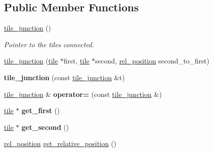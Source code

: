 \subsection*{Public Member Functions}
\begin{DoxyCompactItemize}
\item 
\hypertarget{classtile__junction_a4bf49829337b48a2274208556d370d21}{\hyperlink{classtile__junction_a4bf49829337b48a2274208556d370d21}{tile\-\_\-junction} ()}\label{classtile__junction_a4bf49829337b48a2274208556d370d21}

\begin{DoxyCompactList}\small\item\em Pointer to the tiles connected. \end{DoxyCompactList}\item 
\hyperlink{classtile__junction_a7dc0f70f66725c0eaa1dd5f04e2d6a2a}{tile\-\_\-junction} (\hyperlink{classtile}{tile} $\ast$first, \hyperlink{classtile}{tile} $\ast$second, \hyperlink{classtile__junction_a5456dfccc6f959d29361cde7104b4c25}{rel\-\_\-position} second\-\_\-to\-\_\-first)
\item 
\hypertarget{classtile__junction_a489352ce572927f3c61dd30f969e30bc}{{\bfseries tile\-\_\-junction} (const \hyperlink{classtile__junction}{tile\-\_\-junction} \&t)}\label{classtile__junction_a489352ce572927f3c61dd30f969e30bc}

\item 
\hypertarget{classtile__junction_abb4fe40d3298a13cbd8dece57e5698e7}{\hyperlink{classtile__junction}{tile\-\_\-junction} \& {\bfseries operator=} (const \hyperlink{classtile__junction}{tile\-\_\-junction} \&)}\label{classtile__junction_abb4fe40d3298a13cbd8dece57e5698e7}

\item 
\hypertarget{classtile__junction_aaa07c6f05c7920cf7094df8519998f58}{\hyperlink{classtile}{tile} $\ast$ {\bfseries get\-\_\-first} ()}\label{classtile__junction_aaa07c6f05c7920cf7094df8519998f58}

\item 
\hypertarget{classtile__junction_af16d2b13517989875577aa9269faf630}{\hyperlink{classtile}{tile} $\ast$ {\bfseries get\-\_\-second} ()}\label{classtile__junction_af16d2b13517989875577aa9269faf630}

\item 
\hyperlink{classtile__junction_a5456dfccc6f959d29361cde7104b4c25}{rel\-\_\-position} \hyperlink{classtile__junction_a5d2ffe7afa65c03d043487ae298fa0f3}{get\-\_\-relative\-\_\-position} ()
\end{DoxyCompactItemize}


